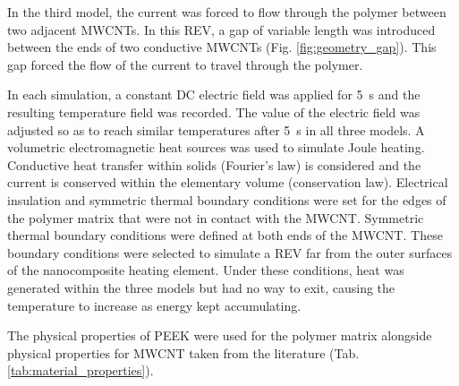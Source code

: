 \documentclass[11pt,review,times]{elsarticle}
\begin{document}
In the third model, the current was forced to flow through the polymer between two adjacent MWCNTs. 
In this REV, a gap of variable length was introduced between the ends of two conductive MWCNTs (Fig. \ref{fig:geometry_gap}). 
This gap forced the flow of the current to travel through the polymer.  

In each simulation, a constant DC electric field was applied for \SI{5}{\second} and the resulting temperature field was recorded. 
The value of the electric field was adjusted so as to reach similar temperatures after \SI{5}{\second} in all three models. 
A volumetric electromagnetic heat sources was used to simulate Joule heating. 
Conductive heat transfer within solids (Fourier's law) is considered and the current is conserved within the elementary volume (conservation law). 
Electrical insulation and symmetric thermal boundary conditions were set for the edges of the polymer matrix that were not in contact with the MWCNT. 
Symmetric thermal boundary conditions were defined at both ends of the MWCNT. 
These boundary conditions were selected to simulate a REV far from the outer surfaces of the nanocomposite heating element. 
Under these conditions, heat was generated within the three models but had no way to exit, causing the temperature to increase as energy kept accumulating.

The physical properties of PEEK were used for the polymer matrix alongside physical properties for MWCNT taken from the literature (Tab. \ref{tab:material_properties}). 

\begin{table}[htb]
\center
{}
\caption{Material properties}
\label{tab:material_properties}
\end{table}
\end{document}
